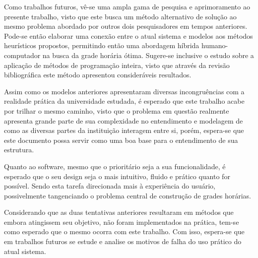     Como trabalhos futuros, vê-se uma ampla gama de pesquisa e aprimoramento ao presente trabalho, visto que este busca um método alternativo de solução ao mesmo problema abordado por outros dois pesquisadores em tempos anteriores. Pode-se então elaborar uma conexão entre o atual sistema e modelos aos métodos heurísticos propostos, permitindo então uma abordagem híbrida humano-computador na busca da grade horária ótima. Sugere-se inclusive o estudo sobre a aplicação de métodos de programação inteira, visto que através da revisão bibliográfica este método apresentou consideráveis resultados.

    Assim como os modelos anteriores apresentaram diversas incongruências com a realidade prática da universidade estudada, é esperado que este trabalho acabe por trilhar o mesmo caminho, visto que o problema em questão realmente apresenta grande parte de sua complexidade no entendimento e modelagem de como as diversas partes da instituição interagem entre si, porém, espera-se que este documento possa servir como uma boa base para o entendimento de sua estrutura.

    Quanto ao software, mesmo que o prioritário seja a sua funcionalidade, é esperado que o seu design seja o mais intuitivo, fluido e prático quanto for possível. Sendo esta tarefa direcionada mais à experiência do usuário, possivelmente tangenciando o problema central de construção de grades horárias.

    Considerando que as duas tentativas anteriores resultaram em métodos que embora atingissem seu objetivo, não foram implementados na prática, tem-se como esperado que o mesmo ocorra com este trabalho. Com isso, espera-se que em trabalhos futuros se estude e analise os motivos de falha do uso prático do atual sistema.
